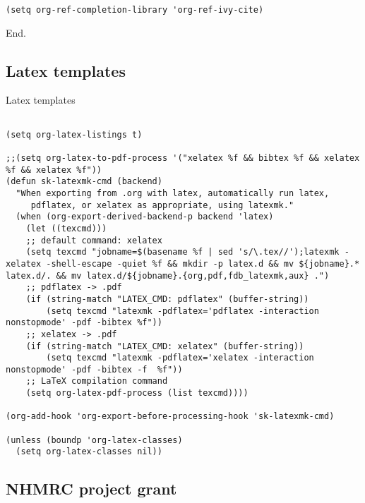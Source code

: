 \documentclass[12pt]{article}
\begin{document}
\lstset{language=Lisp,label= ,caption= ,captionpos=b,numbers=none}
\begin{lstlisting}
(setq org-ref-completion-library 'org-ref-ivy-cite)

\end{lstlisting}
End.

\subsection{Latex templates}
\label{sec:org026bdce}
Latex templates
\lstset{language=Lisp,label= ,caption= ,captionpos=b,numbers=none}
\begin{lstlisting}

(setq org-latex-listings t)

;;(setq org-latex-to-pdf-process '("xelatex %f && bibtex %f && xelatex %f && xelatex %f"))
(defun sk-latexmk-cmd (backend)
  "When exporting from .org with latex, automatically run latex,
     pdflatex, or xelatex as appropriate, using latexmk."
  (when (org-export-derived-backend-p backend 'latex)
    (let ((texcmd)))
    ;; default command: xelatex
    (setq texcmd "jobname=$(basename %f | sed 's/\.tex//');latexmk -xelatex -shell-escape -quiet %f && mkdir -p latex.d && mv ${jobname}.* latex.d/. && mv latex.d/${jobname}.{org,pdf,fdb_latexmk,aux} .")
    ;; pdflatex -> .pdf
    (if (string-match "LATEX_CMD: pdflatex" (buffer-string))
        (setq texcmd "latexmk -pdflatex='pdflatex -interaction nonstopmode' -pdf -bibtex %f"))
    ;; xelatex -> .pdf
    (if (string-match "LATEX_CMD: xelatex" (buffer-string))
        (setq texcmd "latexmk -pdflatex='xelatex -interaction nonstopmode' -pdf -bibtex -f  %f"))
    ;; LaTeX compilation command
    (setq org-latex-pdf-process (list texcmd))))

(org-add-hook 'org-export-before-processing-hook 'sk-latexmk-cmd)

(unless (boundp 'org-latex-classes)
  (setq org-latex-classes nil))
\end{lstlisting}

\subsection{NHMRC project grant}
\label{sec:org93f5603}
\end{document}
